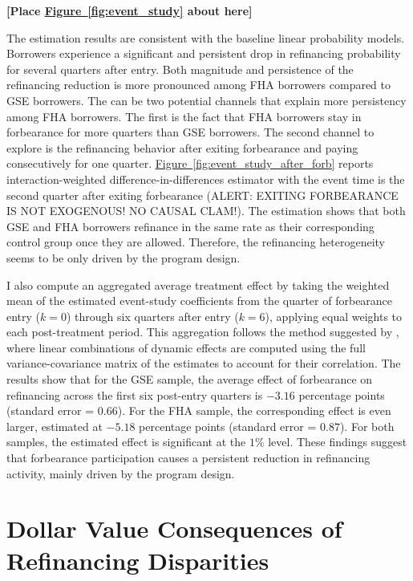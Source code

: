 \documentclass[11pt]{article}
\begin{document}
{\bigskip
\centerline{\bf [Place \hyperref[fig:event_study]{Figure~\ref*{fig:event_study}} about here]}
\bigskip



The estimation results are consistent with the baseline linear probability models. Borrowers experience a significant and persistent drop in refinancing probability for several quarters after entry. Both magnitude and persistence of the refinancing reduction is more pronounced among FHA borrowers compared to GSE borrowers. The can be two potential channels that explain more persistency among FHA borrowers. The first is the fact that FHA borrowers stay in forbearance for more quarters than GSE borrowers. The second channel to explore is the refinancing behavior after exiting forbearance and paying consecutively for one quarter. \hyperlink{fig:event_study_after_forb}{Figure~\ref{fig:event_study_after_forb}} reports interaction-weighted difference-in-differences estimator with the event time is the second quarter after exiting forbearance (ALERT: EXITING FORBEARANCE IS NOT EXOGENOUS! NO CAUSAL CLAM!).  The estimation shows that both GSE and FHA borrowers refinance in the same rate as their corresponding control group once they are allowed. Therefore, the refinancing heterogeneity seems to be only driven by the program design.    

I also compute an aggregated average treatment effect by taking the weighted mean of the estimated event-study coefficients from the quarter of forbearance entry ($k = 0$) through six quarters after entry ($k = 6$), applying equal weights to each post-treatment period. This aggregation follows the method suggested by \citet{sunAbraham2021}, where linear combinations of dynamic effects are computed using the full variance-covariance matrix of the estimates to account for their correlation. The results show that for the GSE sample, the average effect of forbearance on refinancing across the first six post-entry quarters is $-3.16$ percentage points (standard error = $0.66$). For the FHA sample, the corresponding effect is even larger, estimated at $-5.18$ percentage points (standard error = $0.87$). For both samples, the estimated effect is significant at the $1\%$ level. These findings suggest that forbearance participation causes a persistent reduction in refinancing activity, mainly driven by the program design. 

\section{Dollar Value Consequences of
Refinancing Disparities} \label{sec:cf_analysis}

}
\end{document}
